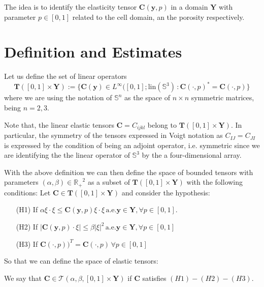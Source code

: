 The idea is to identify the elasticity tensor $\mathbf{C}(\mathbf{y}, p)$ in a domain $\mathbf{Y}$ with parameter $p \in [0,1]$ related to the cell domain, an the porosity respectively.

\section{Definition and Estimates}
\begin{defn}
Let us define the set of linear operators 
\begin{equation*}
    \mathbf{T}([0,1]\times \mathbf{Y}) := \big \{ \mathbf{C}(\mathbf{y}) \in L^{\infty}([0,1]; \text{lin}(\mathbb{S}^3)\, : \mathbf{C}(\cdot, p)^* = \mathbf{C}(\cdot, p) \big \}
\end{equation*}
where we are using the notation of $\mathbb{S}^n$ as the space of $n\times n$ symmetric matrices, being $n=2,3$.
\end{defn}
\begin{rem}
Note that, the linear elastic tensors $\mathbf{C} = C_{ijkl}$ belong to $\mathbf{T}([0,1]\times \mathbf{Y})$. In particular, the symmetry of the tensors expressed in Voigt notation as $C_{IJ}=C_{JI}$ is expressed by the condition of being an adjoint operator, i.e. symmetric since we are identifying the the linear operator of $\mathbb{S}^3$ by the a four-dimensional array.
\end{rem}
With the above definition we can then define the space of bounded tensors with parameters $(\alpha,\beta) \in \mathbb{R_+}^2$ as a subset of $\mathbf{T}([0,1]\times \mathbf{Y})$ with the following conditions:
Let $\mathbf{C} \in \mathbf{T}([0,1]\times \mathbf{Y})$ and consider the hypothesis:
\begin{enumerate}
    \item[(H1)] If $\alpha \xi \cdot \xi \leq \mathbf{C}(\mathbf{y},p)  \xi\cdot\xi\, \text{a.e.} \mathbf{y} \in \mathbf{Y}, \forall p \in [0,1]$.
    \item[(H2)] If $\vert \mathbf{C}(\mathbf{y},p) \cdot \xi \vert \leq \beta \vert \xi \vert^2 \, \text{a.e.}\mathbf{y} \in \mathbf{Y}, \forall p \in [0,1]$
    \item[(H3)] If $\mathbf{C}(\cdot,p))^T = \mathbf{C}(\cdot, p) \,\forall p \in [0,1]$
\end{enumerate}
So that we can define the space of elastic tensors:
\begin{defn}
We say that $\mathbf{C} \in \mathcal{T}(\alpha, \beta, [0,1]\times \mathbf{Y})$
if $\mathbf{C}$ satisfies $(H1)-(H2)-(H3)$.
\end{defn}
